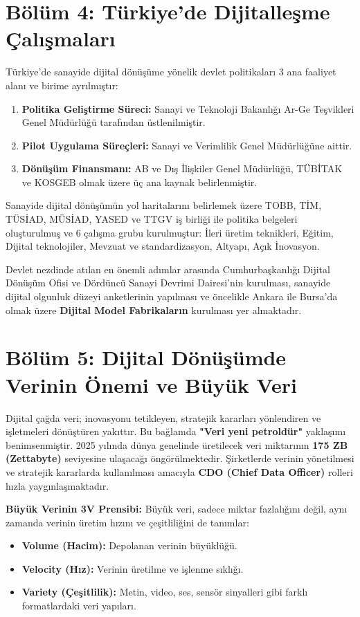 \documentclass[11pt,a4paper,openany]{book}
\begin{document}
\needspace{9cm}
\section{Bölüm 4: Türkiye'de Dijitalleşme Çalışmaları}
Türkiye'de sanayide dijital dönüşüme yönelik devlet politikaları 3 ana faaliyet alanı ve birime ayrılmıştır:
\begin{enumerate}
    \item \textbf{Politika Geliştirme Süreci:} Sanayi ve Teknoloji Bakanlığı Ar-Ge Teşvikleri Genel Müdürlüğü tarafından üstlenilmiştir.
    \item \textbf{Pilot Uygulama Süreçleri:} Sanayi ve Verimlilik Genel Müdürlüğüne aittir.
    \item \textbf{Dönüşüm Finansmanı:} AB ve Dış İlişkiler Genel Müdürlüğü, TÜBİTAK ve KOSGEB olmak üzere üç ana kaynak belirlenmiştir.
\end{enumerate}

Sanayide dijital dönüşümün yol haritalarını belirlemek üzere TOBB, TİM, TÜSİAD, MÜSİAD, YASED ve TTGV iş birliği ile politika belgeleri oluşturulmuş ve 6 çalışma grubu kurulmuştur: İleri üretim teknikleri, Eğitim, Dijital teknolojiler, Mevzuat ve standardizasyon, Altyapı, Açık İnovasyon.

Devlet nezdinde atılan en önemli adımlar arasında Cumhurbaşkanlığı Dijital Dönüşüm Ofisi ve Dördüncü Sanayi Devrimi Dairesi'nin kurulması, sanayide dijital olgunluk düzeyi anketlerinin yapılması ve öncelikle Ankara ile Bursa'da olmak üzere \textbf{Dijital Model Fabrikaların} kurulması yer almaktadır.

\needspace{9cm}
\section{Bölüm 5: Dijital Dönüşümde Verinin Önemi ve Büyük Veri}
Dijital çağda veri; inovasyonu tetikleyen, stratejik kararları yönlendiren ve işletmeleri dönüştüren yakıttır. Bu bağlamda \textbf{"Veri yeni petroldür"} yaklaşımı benimsenmiştir. 2025 yılında dünya genelinde üretilecek veri miktarının \textbf{175 ZB (Zettabyte)} seviyesine ulaşacağı öngörülmektedir. Şirketlerde verinin yönetilmesi ve stratejik kararlarda kullanılması amacıyla \textbf{CDO (Chief Data Officer)} rolleri hızla yaygınlaşmaktadır.

\textbf{Büyük Verinin 3V Prensibi:} Büyük veri, sadece miktar fazlalığını değil, aynı zamanda verinin üretim hızını ve çeşitliliğini de tanımlar:
\begin{itemize}
    \item \textbf{Volume (Hacim):} Depolanan verinin büyüklüğü.
    \item \textbf{Velocity (Hız):} Verinin üretilme ve işlenme sıklığı.
    \item \textbf{Variety (Çeşitlilik):} Metin, video, ses, sensör sinyalleri gibi farklı formatlardaki veri yapıları.
\end{itemize}
\end{document}
